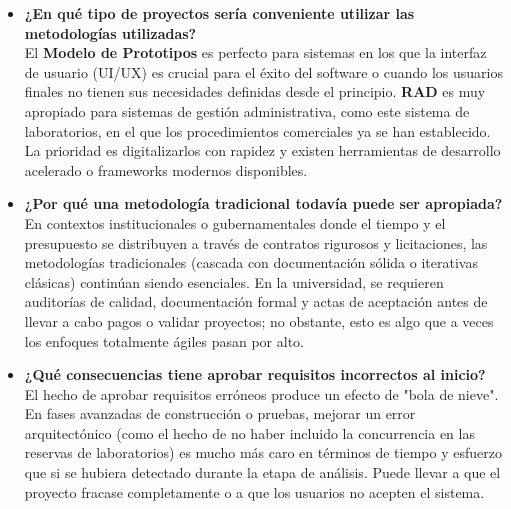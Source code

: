 \documentclass[pdflatex,sn-mathphys-num]{sn-jnl}%
\theoremstyle{thmstyleone}%
\theoremstyle{thmstyletwo}%
\theoremstyle{thmstylethree}%
\begin{document}
\begin{itemize}
 	
 	\item \textbf{¿En qué tipo de proyectos sería conveniente utilizar las metodologías utilizadas?}\\
 	 El \textbf{Modelo de Prototipos} es perfecto para sistemas en los que la interfaz de usuario (UI/UX) es crucial para el éxito del software o cuando los usuarios finales no tienen sus necesidades definidas desde el principio. \textbf{RAD} es muy apropiado para sistemas de gestión administrativa, como este sistema de laboratorios, en el que los procedimientos comerciales ya se han establecido. La prioridad es digitalizarlos con rapidez y existen herramientas de desarrollo acelerado o frameworks modernos disponibles.
 	\item \textbf{¿Por qué una metodología tradicional todavía puede ser apropiada?}\\
 En contextos institucionales o gubernamentales donde el tiempo y el presupuesto se distribuyen a través de contratos rigurosos y licitaciones, las metodologías tradicionales (cascada con documentación sólida o iterativas clásicas) continúan siendo esenciales. En la universidad, se requieren auditorías de calidad, documentación formal y actas de aceptación antes de llevar a cabo pagos o validar proyectos; no obstante, esto es algo que a veces los enfoques totalmente ágiles pasan por alto.
 	\item \textbf{¿Qué consecuencias tiene aprobar requisitos incorrectos al inicio?}\\
 	El hecho de aprobar requisitos erróneos produce un efecto de "bola de nieve". En fases avanzadas de construcción o pruebas, mejorar un error arquitectónico (como el hecho de no haber incluido la concurrencia en las reservas de laboratorios) es mucho más caro en términos de tiempo y esfuerzo que si se hubiera detectado durante la etapa de análisis. Puede llevar a que el proyecto fracase completamente o a que los usuarios no acepten el sistema.
 	

\end{itemize}
\end{document}
